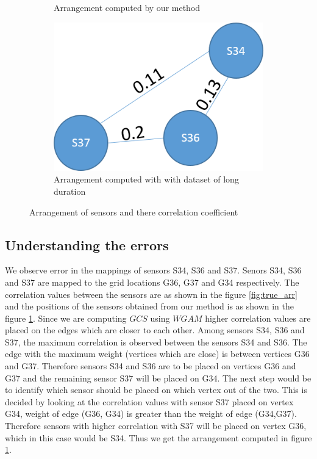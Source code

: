 \begin{figure}[!ht]
\begin{subfigure}[b]{0.4\textwidth}
\caption{Arrangement computed by our method}
\label{fig:false_arr}
\qquad
\end{subfigure}
\begin{subfigure}[b]{0.4\textwidth}
\centering
\includegraphics[scale=0.5]{./pics/long_data_arr.png}
\caption{Arrangement computed with with dataset of long duration}
\label{fig:arr}
\qquad
\end{subfigure}
\caption{Arrangement of sensors and there correlation coefficient}
\label{fig:arrangement}
\end{figure}
\subsection{Understanding the errors}
We observe error in the mappings of sensors S34, S36 and S37. Senors S34, S36 and S37 are mapped to the grid locations G36, G37 and G34 respectively. The correlation values between the sensors are as shown in the figure \ref{fig:true_arr} and the positions of the sensors obtained from our method is as shown in the figure \ref{fig:false_arr}. Since we are computing $GCS$ using $WGAM$ higher correlation values are placed on the edges which are closer to each other. Among sensors S34, S36 and S37, the maximum correlation is observed between the sensors S34 and S36. The edge with the maximum weight (vertices which are close) is between vertices G36 and G37. Therefore sensors S34 and S36 are to be placed on vertices G36 and G37 and the remaining sensor S37 will be placed on G34. The next step would be to identify which sensor should be placed on which vertex out of the two. This is decided by looking at the correlation values with sensor S37 placed on vertex G34, weight of edge (G36, G34) is greater than the weight of edge (G34,G37). Therefore sensors with higher correlation with S37 will be placed on vertex G36, which in this case would be S34. Thus we get the arrangement computed in figure \ref{fig:false_arr}.


